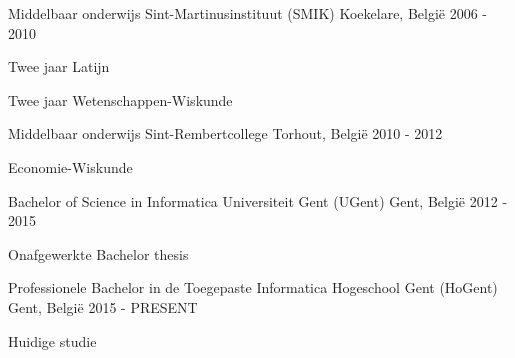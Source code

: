 \begin{cventries}
 \cventry
    {Middelbaar onderwijs}
    {Sint-Martinusinstituut (SMIK)}
    {Koekelare, Belgi\"{e}}
    {2006 - 2010}
    {
      \begin{cvitems}
        \item {Twee jaar Latijn}
	\item {Twee jaar Wetenschappen-Wiskunde}
      \end{cvitems}
    }
 \cventry
    {Middelbaar onderwijs}
    {Sint-Rembertcollege}
    {Torhout, Belgi\"{e}}
    {2010 - 2012}
    {
      \begin{cvitems}
        \item {Economie-Wiskunde}
      \end{cvitems}
    }
  \cventry
    {Bachelor of Science in Informatica}
    {Universiteit Gent (UGent)}
    {Gent, Belgi\"{e}}
    {2012 - 2015}
    {
      \begin{cvitems}
        \item {Onafgewerkte Bachelor thesis}
      \end{cvitems}
    }
  \cventry
    {Professionele Bachelor in de Toegepaste Informatica}
    {Hogeschool Gent (HoGent)}
    {Gent, Belgi\"{e}}
    {2015 - PRESENT}
    {
      \begin{cvitems}
        \item {Huidige studie}
      \end{cvitems}
    }
\end{cventries}
